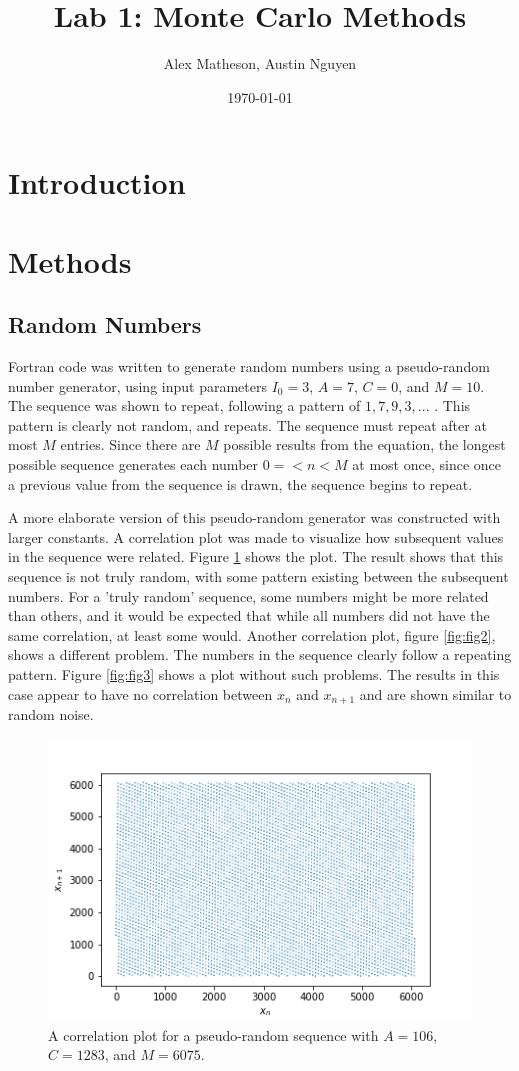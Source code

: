 \documentclass[twocolumn]{article}
\begin{document}
\title{Lab 1: Monte Carlo Methods}
\author{Alex Matheson, Austin Nguyen}
\date{\today}
\maketitle

\section{Introduction}

\section{Methods}
\subsection{Random Numbers}
Fortran code was written to generate random numbers using a pseudo-random number generator, using input parameters $I_0=3$, $A=7$, $C=0$, and $M=10$. The sequence was shown to repeat, following a pattern of $1,7,9,3,...$ . This pattern is clearly not random, and repeats. The sequence must repeat after at most $M$ entries. Since there are $M$ possible results from the equation, the longest possible sequence generates each number $0=<n<M$ at most once, since once a previous value from the sequence is drawn, the sequence begins to repeat. 

A more elaborate version of this pseudo-random generator was constructed with larger constants. A correlation plot was made to visualize how subsequent values in the sequence were related. Figure \ref{fig:fig1} shows the plot. The result shows that this sequence is not truly random, with some pattern existing between the subsequent numbers. For a 'truly random' sequence, some numbers might be more related than others, and it would be expected that while all numbers did not have the same correlation, at least some would. Another correlation plot, figure \ref{fig:fig2}, shows a different problem. The numbers in the sequence clearly follow a repeating pattern. Figure \ref{fig:fig3} shows a plot without such problems. The results in this case appear to have no correlation between $x_n$ and $x_{n+1}$ and are shown similar to random noise.

\begin{figure}
\centering
\includegraphics[width=0.7\linewidth]{fig1}
\caption{A correlation plot for a pseudo-random sequence with $A=106$, $C=1283$, and $M=6075$.}
\label{fig:fig1}
\end{figure}
\end{document}
